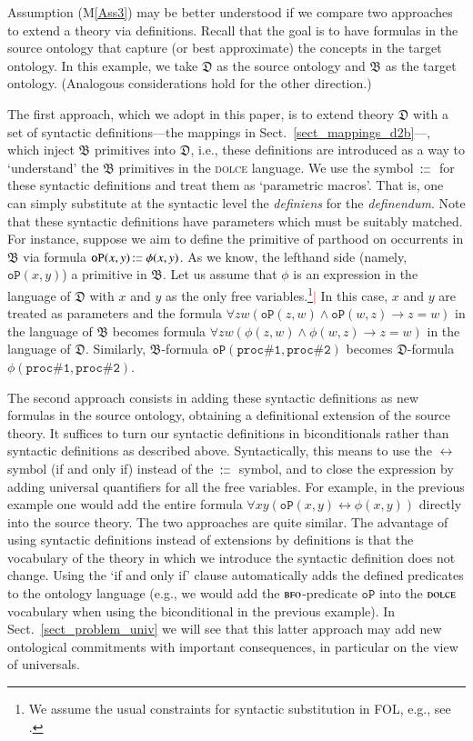 \documentclass[ao]{iosart2x}
\newcommand{\nb}[1]{\textcolor{red}{$|$}\marginpar{\hspace*{-0cm}\parbox{20mm}{\scriptsize\raggedright\textcolor{red}{#1}}}}
\newcommand{\pr}[1]{\mathtt{#1}}
\newcommand{\cn}[1]{\mathtt{#1}}
\newcommand{\ifif}{\leftrightarrow}
\newcommand\textequal{%
 \rule[.08ex]{5pt}{0.35pt}\llap{\rule[.78ex]{5pt}{0.35pt}}}
\newcommand{\sdef}{{\hspace{1.5pt}:\hspace{-2.5pt}\textequal\hspace{3pt}}}
\newcommand{\dolce}{{\textsc{dolce}}}
\newcommand{\bfo}{{\textsc{bfo}}}
\newcommand {\thdolce} {\ensuremath{\mathfrak{D}}}
\newcommand {\thbfo} {\ensuremath{\mathfrak{B}}}
\newcommand{\bfoopart}{\pr{oP}}
\begin{document}
Assumption (M\ref{Ass3}) may be better understood if we compare two approaches to extend a theory via definitions. 
Recall that the goal is to have formulas in the source ontology that capture (or best approximate) the concepts in the target ontology. In this example, we take {$\thdolce$} as the source ontology and {$\thbfo$} as the target ontology. (Analogous considerations hold for the other direction.)

The first approach, which we adopt in this paper, is to extend theory $\thdolce$ with a set of syntactic definitions---the mappings in Sect.~\ref{sect_mappings_d2b}---, which inject {$\thbfo$} primitives into {$\thdolce$}, i.e., these definitions are introduced as a way to `understand' the {$\thbfo$} primitives in the {\dolce} language. 
We use the symbol {$\sdef$} for these syntactic definitions and treat them as `parametric macros'. That is, one can simply substitute at the syntactic level the \emph{definiens} for the \emph{definendum}. Note that these syntactic definitions have parameters which must be suitably matched. For instance, suppose we aim to define the primitive of parthood on occurrents in {$\thbfo$} via formula $\bfoopart(x,y) \sdef \phi(x,y)$. As we know, the lefthand side (namely, $\bfoopart(x,y)$) a primitive in {$\thbfo$}. Let us assume that $\phi$ is an expression in the language of {$\thdolce$} with $x$ and $y$ as the only free variables.\footnote{We assume the usual constraints for syntactic substitution in FOL, e.g., see \cite{?}.}\nb{CM: Serve questa nota? In caso aggiungere riferimento} In this case, $x$ and $y$ are treated as parameters and the formula $\forall zw(\bfoopart(z,w) \land \bfoopart(w,z) \to z=w)$ in the language of {$\thbfo$} becomes formula $\forall zw(\phi(z,w) \land \phi(w,z) \to z=w)$ in the language of {$\thdolce$}. Similarly, {$\thbfo$}-formula $\bfoopart(\cn{proc\#1},\cn{proc\#2})$ becomes {$\thdolce$}-formula $\phi(\cn{proc\#1},\cn{proc\#2})$. 

The second approach consists in adding these syntactic definitions as new formulas in the source ontology, obtaining a definitional extension of the source theory. %
It suffices to turn our syntactic definitions in biconditionals rather than syntactic definitions as described above. Syntactically, this means to use the $\ifif$ symbol (if and only if) instead of the $\sdef$ symbol, and to close the expression by adding universal quantifiers for all the free variables. For example, in the previous example one would add the entire formula $\forall xy(\bfoopart(x,y) \ifif \phi(x,y))$ directly into the source theory. The two approaches are quite similar. The advantage of using syntactic definitions instead of extensions by definitions is that the vocabulary of the theory in which we introduce the syntactic definition does not change. Using the `if and only if' clause automatically adds the defined predicates to the ontology language (e.g., we would add the {$\bfo$}-predicate $\bfoopart$ into the {$\dolce$} vocabulary when using the biconditional in the previous example). In Sect.~\ref{sect_problem_univ} we will see that this latter approach may add new ontological commitments with important consequences, in particular on the view of universals.
\end{document}
